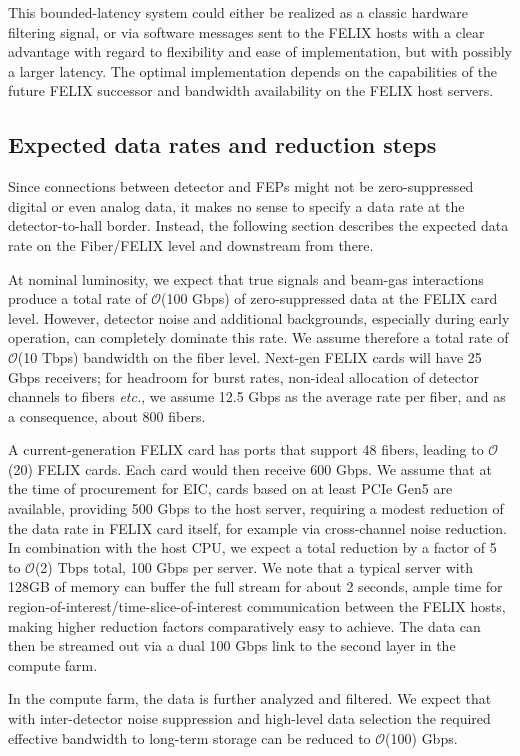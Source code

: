 This bounded-latency system could either be realized as a classic hardware filtering signal, or via software messages sent to the FELIX hosts with a clear advantage with regard to flexibility and ease of implementation, but with possibly a larger latency. The optimal implementation depends on the capabilities of the future FELIX successor and bandwidth availability on the FELIX host servers.



\subsection{Expected data rates and reduction steps}


Since connections between detector and FEPs might not be zero-suppressed digital or even analog data, it makes no sense to specify a data rate at the detector-to-hall border. Instead, the following section describes the expected data rate on the Fiber/FELIX level and downstream from there.

At nominal luminosity, we expect that true signals and beam-gas interactions produce a total rate of $\mathcal{O}$(100 Gbps) of zero-suppressed data at the FELIX card level. However, detector noise and additional backgrounds, especially during early operation, can completely dominate this rate. We assume therefore a total rate of $\mathcal{O}$(10 Tbps) bandwidth on the fiber level. Next-gen FELIX cards will have 25 Gbps receivers; for headroom for burst rates, non-ideal allocation of detector channels to fibers \emph{etc.}, we assume 12.5 Gbps as the average rate per fiber, and as a consequence, about 800 fibers.

A current-generation FELIX card has ports that support 48 fibers, leading to $\mathcal{O}$(20) FELIX cards. Each card would then receive 600 Gbps. We assume that at the time of procurement for EIC, cards based on at least PCIe Gen5 are available, providing 500 Gbps to the host server, requiring a modest reduction of the data rate in FELIX card itself, for example via cross-channel noise reduction. In combination with the host CPU, we expect a total reduction by a factor of 5 to $\mathcal{O}$(2) Tbps total, 100 Gbps per server. We note that a typical server with 128GB of memory can buffer the full stream for about 2 seconds, ample time for region-of-interest/time-slice-of-interest communication between the FELIX hosts, making higher reduction factors comparatively easy to achieve. The data can then be streamed out via a dual 100 Gbps link to the second layer in the compute farm.

In the compute farm, the data is further analyzed and filtered. We expect that with inter-detector noise suppression and high-level data selection the required effective bandwidth to long-term storage can be reduced to $\mathcal{O}$(100) Gbps.  






